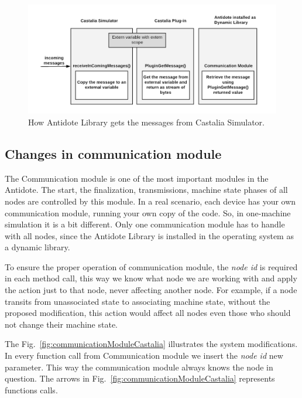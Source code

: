 \begin{figure}[htbp]
\centerline{\includegraphics[scale=0.28]{figures/castaliaPlugin.png}}
\caption{How Antidote Library gets the messages from Castalia Simulator.}
\label{fig:CastaliaPlugin}
\end{figure}

\subsection{Changes in communication module}

The Communication module is one of the most important modules in the Antidote. The start, the finalization, transmissions, machine state phases of all nodes are controlled by this module. In a real scenario, each device has your own communication module, running your own copy of the code. So, in one-machine simulation it is a bit different. Only one communication module has to handle with all nodes, since the Antidote Library is installed in the operating system as a dynamic library.

To ensure the proper operation of communication module, the \textit{node id} is required in each method call, this way we know what node we are working with and apply the action just to that node, never affecting another node. For example, if a node transits from unassociated state to associating machine state, without the proposed modification, this action would affect all nodes even those who should not change their machine state.

The Fig.~\ref{fig:communicationModuleCastalia} illustrates the system modifications. In every function call from Communication module we insert the \textit{node id} new parameter. This way the communication module always knows the node in question. The arrows in Fig.~\ref{fig:communicationModuleCastalia} represents functions calls.

